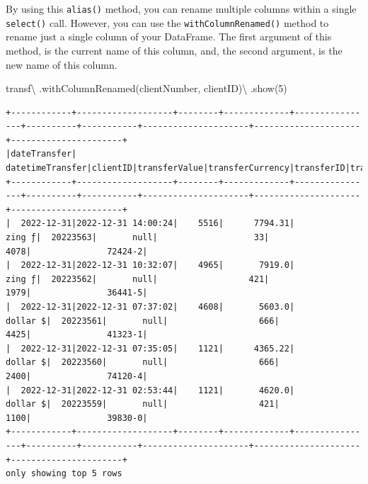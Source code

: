 \documentclass[
  11pt,
  letterpaper,
  DIV=11,
  numbers=noendperiod]{scrreprt}
\newenvironment{Shaded}{\begin{snugshade}}{\end{snugshade}}
\newcommand{\DecValTok}[1]{\textcolor[rgb]{0.68,0.00,0.00}{#1}}
\newcommand{\NormalTok}[1]{\textcolor[rgb]{0.00,0.23,0.31}{#1}}
\newcommand{\OperatorTok}[1]{\textcolor[rgb]{0.37,0.37,0.37}{#1}}
\newcommand{\StringTok}[1]{\textcolor[rgb]{0.13,0.47,0.30}{#1}}
\begin{document}
By using this \texttt{alias()} method, you can rename multiple columns
within a single \texttt{select()} call. However, you can use the
\texttt{withColumnRenamed()} method to rename just a single column of
your DataFrame. The first argument of this method, is the current name
of this column, and, the second argument, is the new name of this
column.

\begin{Shaded}
\begin{Highlighting}[]
\NormalTok{transf}\OperatorTok{\textbackslash{}}
\NormalTok{  .withColumnRenamed(}\StringTok{\textquotesingle{}clientNumber\textquotesingle{}}\NormalTok{, }\StringTok{\textquotesingle{}clientID\textquotesingle{}}\NormalTok{)}\OperatorTok{\textbackslash{}}
\NormalTok{  .show(}\DecValTok{5}\NormalTok{)}
\end{Highlighting}
\end{Shaded}

\begin{verbatim}
+------------+-------------------+--------+-------------+----------------+----------+-----------+---------------------+---------------------+----------------------+
|dateTransfer|   datetimeTransfer|clientID|transferValue|transferCurrency|transferID|transferLog|destinationBankNumber|destinationBankBranch|destinationBankAccount|
+------------+-------------------+--------+-------------+----------------+----------+-----------+---------------------+---------------------+----------------------+
|  2022-12-31|2022-12-31 14:00:24|    5516|      7794.31|          zing ƒ|  20223563|       null|                   33|                 4078|               72424-2|
|  2022-12-31|2022-12-31 10:32:07|    4965|       7919.0|          zing ƒ|  20223562|       null|                  421|                 1979|               36441-5|
|  2022-12-31|2022-12-31 07:37:02|    4608|       5603.0|        dollar $|  20223561|       null|                  666|                 4425|               41323-1|
|  2022-12-31|2022-12-31 07:35:05|    1121|      4365.22|        dollar $|  20223560|       null|                  666|                 2400|               74120-4|
|  2022-12-31|2022-12-31 02:53:44|    1121|       4620.0|        dollar $|  20223559|       null|                  421|                 1100|               39830-0|
+------------+-------------------+--------+-------------+----------------+----------+-----------+---------------------+---------------------+----------------------+
only showing top 5 rows
\end{verbatim}
\end{document}
